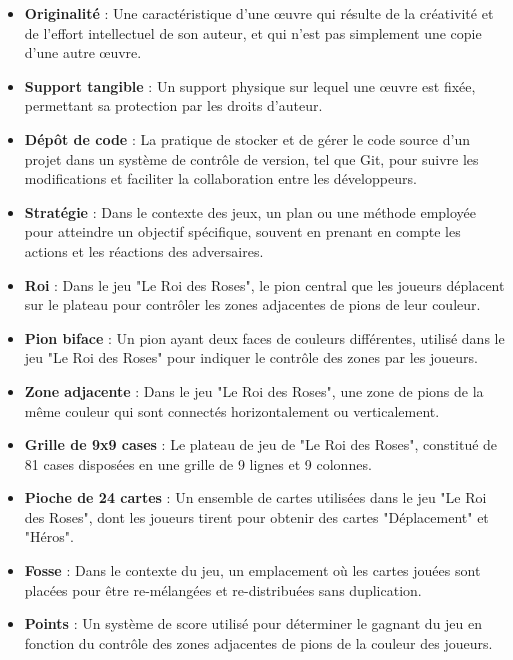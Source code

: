 \begin{itemize}
    \item \textbf{Originalité} : Une caractéristique d'une œuvre qui résulte de la créativité et de l'effort intellectuel de son auteur, et qui n'est pas simplement une copie d'une autre œuvre.

    \item \textbf{Support tangible} : Un support physique sur lequel une œuvre est fixée, permettant sa protection par les droits d'auteur.

    \item \textbf{Dépôt de code} : La pratique de stocker et de gérer le code source d'un projet dans un système de contrôle de version, tel que Git, pour suivre les modifications et faciliter la collaboration entre les développeurs.

    \item \textbf{Stratégie} : Dans le contexte des jeux, un plan ou une méthode employée pour atteindre un objectif spécifique, souvent en prenant en compte les actions et les réactions des adversaires.

    \item \textbf{Roi} : Dans le jeu "Le Roi des Roses", le pion central que les joueurs déplacent sur le plateau pour contrôler les zones adjacentes de pions de leur couleur.

    \item \textbf{Pion biface} : Un pion ayant deux faces de couleurs différentes, utilisé dans le jeu "Le Roi des Roses" pour indiquer le contrôle des zones par les joueurs.

    \item \textbf{Zone adjacente} : Dans le jeu "Le Roi des Roses", une zone de pions de la même couleur qui sont connectés horizontalement ou verticalement.

    \item \textbf{Grille de 9x9 cases} : Le plateau de jeu de "Le Roi des Roses", constitué de 81 cases disposées en une grille de 9 lignes et 9 colonnes.

    \item \textbf{Pioche de 24 cartes} : Un ensemble de cartes utilisées dans le jeu "Le Roi des Roses", dont les joueurs tirent pour obtenir des cartes "Déplacement" et "Héros".

    \item \textbf{Fosse} : Dans le contexte du jeu, un emplacement où les cartes jouées sont placées pour être re-mélangées et re-distribuées sans duplication.

    \item \textbf{Points} : Un système de score utilisé pour déterminer le gagnant du jeu en fonction du contrôle des zones adjacentes de pions de la couleur des joueurs.
\end{itemize}

